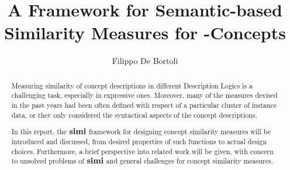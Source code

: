 \documentclass{llncs}
\title{A Framework for Semantic-based Similarity Measures for \elh-Concepts}
\author{Filippo De Bortoli}
\institute{European Master's Program in Computational Logic, TU Dresden}%
\begin{document}
  \maketitle

  \begin{abstract}
    Measuring similarity of concept descriptions in different Description Logics is a challenging task, especially in expressive ones.
    Moreover, many of the measures devised in the past years had been often defined with respect of a particular cluster of instance data, or they only considered the syntactical aspects of the concept descriptions.

    In this report, the \(\operatorname{\mathbf{simi}}\) framework for designing concept similarity measures will be introduced and discussed, from desired properties of such functions to actual design choices.
    Furthermore, a brief perspective into related work will be given, with concern to unsolved problems of \(\operatorname{\mathbf{simi}}\) and general challenges for concept similarity measures.
  \end{abstract}

  
  
  
  
  
\end{document}
